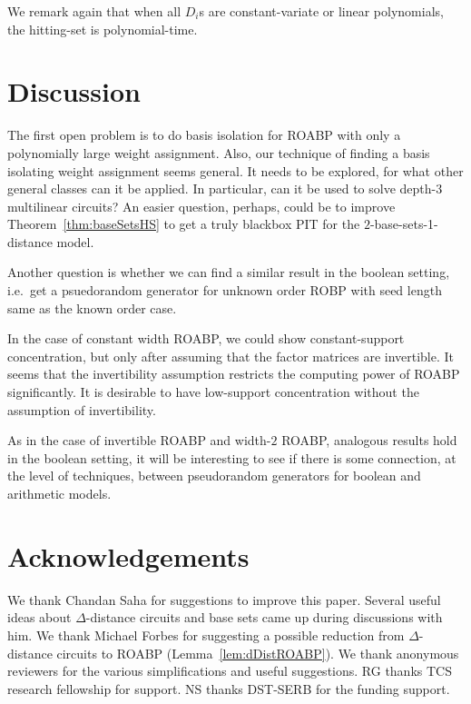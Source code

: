 \documentclass[final,oneeqnum, onethmnum, onefignum]{siamltex1213}
\newcommand{\di}{\Delta} %
\begin{document}
We remark again that when %
all $D_i$s are constant-variate or linear polynomials,
the hitting-set is polynomial-time.
 

\section{Discussion}

The first open problem is to do basis isolation for ROABP with only a polynomially large
weight assignment.
Also, our technique of finding a basis isolating weight assignment seems general. 
It needs to be explored, for what other general classes can it be applied.
In particular, can it be used to solve depth-$3$ multilinear circuits?
An easier question, perhaps, could be to improve Theorem~\ref{thm:baseSetsHS}
to get a truly blackbox PIT for the $2$-base-sets-1-distance model.

Another question is whether we can find a similar result in the boolean setting,
i.e.\ get a psuedorandom generator for unknown order ROBP with seed length same as
the known order case.

In the case of constant width ROABP, 
we could show constant-support concentration, but
only after assuming that the factor matrices are invertible. 
It seems that the invertibility assumption restricts the computing power of ROABP
significantly.
It is desirable to have low-support concentration without the
assumption of invertibility. 

As in the case of invertible ROABP and width-$2$ ROABP, analogous results
hold in the boolean setting, it will be interesting to see if there is some connection,
at the level of techniques,
between pseudorandom generators for boolean and arithmetic models.   

\section{Acknowledgements}
We thank Chandan Saha for suggestions to improve this paper. 
Several useful ideas about $\di$-distance circuits and 
base sets came up during discussions with him.
We thank Michael Forbes for suggesting a possible reduction from $\di$-distance circuits
to ROABP (Lemma~\ref{lem:dDistROABP}).
We thank anonymous reviewers for the various simplifications and useful suggestions. 
RG thanks TCS research fellowship for support.
NS thanks DST-SERB for the funding support.




\end{document}
